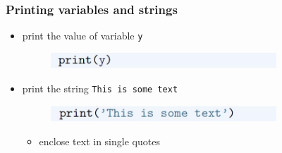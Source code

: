\documentclass[14pt]{beamer}
\begin{document}

\begin{frame}[fragile]
\frametitle{Printing variables and strings}

\begin{itemize}
\item print the value of variable \texttt{y}

\begin{figure}[ht]
	\centering
	\includegraphics[width=0.8\textwidth]{figures/LLp27a}
\end{figure}

\vspace*{10mm}
\item print the string \texttt{This is some text}
\begin{figure}[ht]
	\centering
	\includegraphics[width=0.8\textwidth]{figures/LLp27b}
\end{figure}
	\begin{itemize}
		\item enclose text in single quotes
	\end{itemize}
\end{itemize}

\end{frame}

\end{document}
